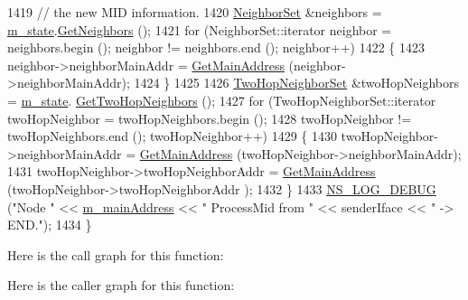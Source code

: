 \begin{DoxyCode}
1419   \textcolor{comment}{// the new MID information.}
1420   \hyperlink{namespacens3_1_1olsr_af0afef1f28c6f0a0b528b03b638df05d}{NeighborSet} &neighbors = \hyperlink{classns3_1_1olsr_1_1RoutingProtocol_a07942ec1a7df71b609c8d2ff3b567c49}{m\_state}.\hyperlink{classns3_1_1olsr_1_1OlsrState_a82d5882ca3fdb93a9c1110c6f176c03c}{GetNeighbors} ();
1421   \textcolor{keywordflow}{for} (NeighborSet::iterator neighbor = neighbors.begin (); neighbor != neighbors.end (); neighbor++)
1422     \{
1423       neighbor->neighborMainAddr = \hyperlink{classns3_1_1olsr_1_1RoutingProtocol_ae01451170fb389d322b33ed6d954f460}{GetMainAddress} (neighbor->neighborMainAddr);
1424     \}
1425 
1426   \hyperlink{namespacens3_1_1olsr_a5f9963792af7fea4dc66fb8718394604}{TwoHopNeighborSet} &twoHopNeighbors = \hyperlink{classns3_1_1olsr_1_1RoutingProtocol_a07942ec1a7df71b609c8d2ff3b567c49}{m\_state}.
      \hyperlink{classns3_1_1olsr_1_1OlsrState_ab03738874d0d785b770beef6dc9c2e1a}{GetTwoHopNeighbors} ();
1427   \textcolor{keywordflow}{for} (TwoHopNeighborSet::iterator twoHopNeighbor = twoHopNeighbors.begin ();
1428        twoHopNeighbor != twoHopNeighbors.end (); twoHopNeighbor++)
1429     \{
1430       twoHopNeighbor->neighborMainAddr = \hyperlink{classns3_1_1olsr_1_1RoutingProtocol_ae01451170fb389d322b33ed6d954f460}{GetMainAddress} (twoHopNeighbor->neighborMainAddr);
1431       twoHopNeighbor->twoHopNeighborAddr = \hyperlink{classns3_1_1olsr_1_1RoutingProtocol_ae01451170fb389d322b33ed6d954f460}{GetMainAddress} (twoHopNeighbor->twoHopNeighborAddr
      );
1432     \}
1433   \hyperlink{group__logging_ga413f1886406d49f59a6a0a89b77b4d0a}{NS\_LOG\_DEBUG} (\textcolor{stringliteral}{"Node "} << \hyperlink{classns3_1_1olsr_1_1RoutingProtocol_a58cc50ed5d1039aab603e90e318aabfb}{m\_mainAddress} << \textcolor{stringliteral}{" ProcessMid from "} << senderIface << \textcolor{stringliteral}{
      " -> END."});
1434 \}
\end{DoxyCode}


Here is the call graph for this function\+:




Here is the caller graph for this function\+:



